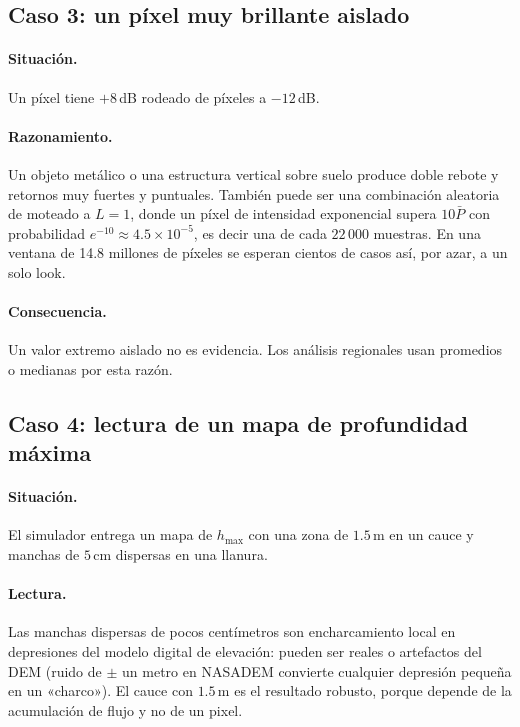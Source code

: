 \documentclass[11pt,a4paper]{article}
\begin{document}
\subsection{Caso 3: un píxel muy brillante aislado}

\paragraph{Situación.} Un píxel tiene $+8$\,dB rodeado de píxeles a $-12$\,dB.

\paragraph{Razonamiento.} Un objeto metálico o una estructura vertical sobre suelo produce doble rebote y
retornos muy fuertes y puntuales. También puede ser una combinación aleatoria de moteado a $L=1$, donde un
píxel de intensidad exponencial supera $10\bar P$ con probabilidad $e^{-10}\approx4.5\times10^{-5}$, es decir una
de cada $22\,000$ muestras. En una ventana de 14.8 millones de píxeles se esperan cientos de casos así,
por azar, a un solo look.

\paragraph{Consecuencia.} Un valor extremo aislado no es evidencia. Los análisis regionales usan promedios o
medianas por esta razón.

\subsection{Caso 4: lectura de un mapa de profundidad máxima}

\paragraph{Situación.} El simulador entrega un mapa de $h_{\max}$ con una zona de $1.5$\,m en un cauce y
manchas de $5$\,cm dispersas en una llanura.

\paragraph{Lectura.} Las manchas dispersas de pocos centímetros son encharcamiento local en depresiones del
modelo digital de elevación: pueden ser reales o artefactos del DEM (ruido de $\pm$ un metro en NASADEM
convierte cualquier depresión pequeña en un «charco»). El cauce con $1.5$\,m es el resultado robusto, porque
depende de la acumulación de flujo y no de un pixel.
\end{document}
